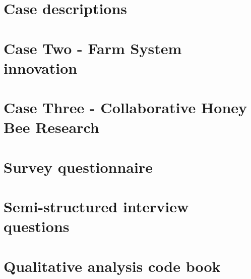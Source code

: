 \documentclass[12pt,twoside]{report}
\begin{document}
\chapter{Case descriptions}




\chapter{Case Two - Farm System innovation}

%
\chapter{Case Three - Collaborative Honey Bee Research}

%
%
%


\pagebreak




\appendix

\chapter{Survey questionnaire}


\chapter{Semi-structured interview questions}


\chapter{Qualitative analysis code book}

\end{document}
